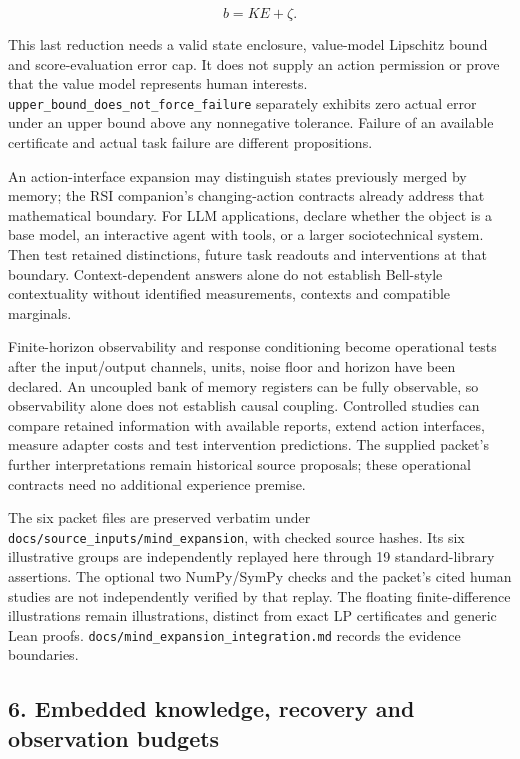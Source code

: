 \documentclass[
  10pt,
]{article}
\begin{document}
\protect\hypertarget{math-E0042-0045}{}{\[
b=KE+\zeta.
\]}

This last reduction needs a valid state enclosure, value-model Lipschitz bound and score-evaluation error cap. It does not supply an action permission or prove that the value model represents human interests. \texttt{upper\_bound\_does\_not\_force\_failure} separately exhibits zero actual error under an upper bound above any nonnegative tolerance. Failure of an available certificate and actual task failure are different propositions.

An action-interface expansion may distinguish states previously merged by memory; the RSI companion's changing-action contracts already address that mathematical boundary. For LLM applications, declare whether the object is a base model, an interactive agent with tools, or a larger sociotechnical system. Then test retained distinctions, future task readouts and interventions at that boundary. Context-dependent answers alone do not establish Bell-style contextuality without identified measurements, contexts and compatible marginals.

Finite-horizon observability and response conditioning become operational tests after the input/output channels, units, noise floor and horizon have been declared. An uncoupled bank of memory registers can be fully observable, so observability alone does not establish causal coupling. Controlled studies can compare retained information with available reports, extend action interfaces, measure adapter costs and test intervention predictions. The supplied packet's further interpretations remain historical source proposals; these operational contracts need no additional experience premise.

The six packet files are preserved verbatim under \texttt{docs/source\_inputs/mind\_expansion}, with checked source hashes. Its six illustrative groups are independently replayed here through 19 standard-library assertions. The optional two NumPy/SymPy checks and the packet's cited human studies are not independently verified by that replay. The floating finite-difference illustrations remain illustrations, distinct from exact LP certificates and generic Lean proofs. \texttt{docs/mind\_expansion\_integration.md} records the evidence boundaries.

\subsection{6. Embedded knowledge, recovery and observation budgets}\label{embedded-knowledge-recovery-and-observation-budgets}
\end{document}
